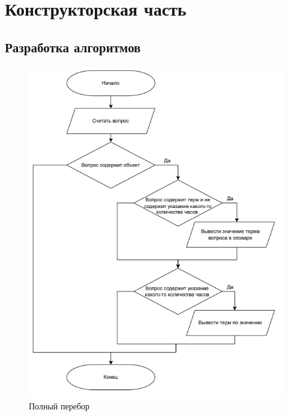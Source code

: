 \section{Конструкторская часть}

\subsection*{Разработка алгоритмов}

\begin{figure}[hbtp]
	\centering
	\includegraphics[scale=0.9]{images/sch.png}
	\caption{Полный перебор}
	\label{img:brute}
\end{figure}


